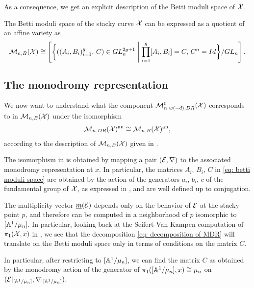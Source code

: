 \documentclass{article}
\begin{document}
As a consequence, we get an explicit description of the Betti moduli space of $\mathcal{X}$.
\begin{cor} \label{Betti moduli space}
The Betti moduli space of the stacky curve $\mathcal{X}$ can be expressed as a quotient of an affine variety as
\begin{equation}
\mathcal{M}_{n, B}(\mathcal{X}) \cong \left[ \bigg\{ ((A_i, B_i)_{i = 1}^g, \, C) \in GL_n^{2g +1} \;\middle|\; \prod_{i=1}^{g}[A_i, B_i] = C, \, C^n = Id \bigg\} / GL_n \right]. \label{eq: betti moduli space}
\end{equation}
\end{cor}

\subsection{The monodromy representation}
We now want to understand what the component $\mathcal{M}_{n \cdot w(-d), DR}^0(\mathcal{X})$ corresponds to in $\mathcal{M}_{n, B}(\mathcal{X})$ under the isomorphism
\begin{equation} \label{Riemann -Hilbert}
\mathcal{M}_{n, DR}(\mathcal{X})^{\text{an}} \cong \mathcal{M}_{n, B}(\mathcal{X})^{\text{an}},
\end{equation}
according to the description of $\mathcal{M}_{n, B}(\mathcal{X})$ given in .

The isomorphism in  is obtained by mapping a pair $(\mathcal{E}, \nabla)$ to the associated monodromy representation at $x$. In particular, the matrices $A_i, \, B_i, \, C$ in \eqref{eq: betti moduli space} are obtained by the action of the generators $a_i, \, b_i, \, c$ of the fundamental group of $\mathcal{X}$, as expressed in , and are well defined up to conjugation.

The multiplicity vector $\underline{m}(\mathcal{E})$ depends only on the behavior of $\mathcal{E}$ at the stacky point $p$, and therefore can be computed in a neighborhood of $p$ isomorphic to $[\mathbb{A}^1 / \mu_n]$. In particular, looking back at the Seifert-Van Kampen computation of $\pi_1(\mathcal{X}, x)$ in , we see that the decomposition \eqref{eq: decomposition of MDR} will translate on the Betti moduli space only in terms of conditions on the matrix $C$.

In particular, after restricting to $[\mathbb{A}^1/ \mu_n]$, we can find the matrix $C$ as obtained by the monodromy action of the generator of $\pi_1([\mathbb{A}^1 / \mu_n], x) \cong \mu_n$ on $(\mathcal{E}\vert_{[\mathbb{A}^1 / \mu_n]}, \nabla\vert_{[\mathbb{A}^1 / \mu_n]})$.
\end{document}
